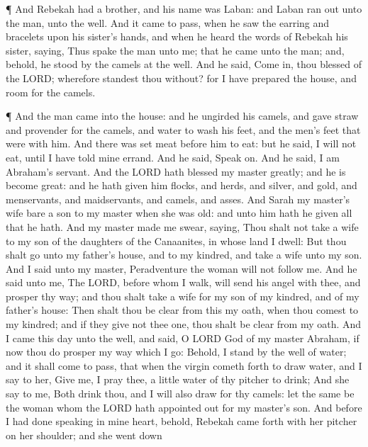  ¶ And Rebekah had a brother, and his name was Laban: and
Laban ran out unto the man, unto the well.  And it came to
pass, when he saw the earring and bracelets upon his sister's hands, and
when he heard the words of Rebekah his sister, saying, Thus spake the
man unto me; that he came unto the man; and, behold, he stood by the
camels at the well.  And he said, Come in, thou blessed of
the LORD; wherefore standest thou without? for I have prepared the
house, and room for the camels.

 ¶ And the man came into the house: and he ungirded his
camels, and gave straw and provender for the camels, and water to wash
his feet, and the men's feet that were with him.  And there
was set meat before him to eat: but he said, I will not eat, until I
have told mine errand. And he said, Speak on.  And he said,
I am Abraham's servant.  And the LORD hath blessed my
master greatly; and he is become great: and he hath given him flocks,
and herds, and silver, and gold, and menservants, and maidservants, and
camels, and asses.  And Sarah my master's wife bare a son
to my master when she was old: and unto him hath he given all that he
hath.  And my master made me swear, saying, Thou shalt not
take a wife to my son of the daughters of the Canaanites, in whose land
I dwell:  But thou shalt go unto my father's house, and to
my kindred, and take a wife unto my son.  And I said unto
my master, Peradventure the woman will not follow me.  And
he said unto me, The LORD, before whom I walk, will send his angel with
thee, and prosper thy way; and thou shalt take a wife for my son of my
kindred, and of my father's house:  Then shalt thou be
clear from this my oath, when thou comest to my kindred; and if they
give not thee one, thou shalt be clear from my oath.  And I
came this day unto the well, and said, O LORD God of my master Abraham,
if now thou do prosper my way which I go:  Behold, I stand
by the well of water; and it shall come to pass, that when the virgin
cometh forth to draw water, and I say to her, Give me, I pray thee, a
little water of thy pitcher to drink;  And she say to me,
Both drink thou, and I will also draw for thy camels: let the same be
the woman whom the LORD hath appointed out for my master's son.
 And before I had done speaking in mine heart, behold,
Rebekah came forth with her pitcher on her shoulder; and she went down
